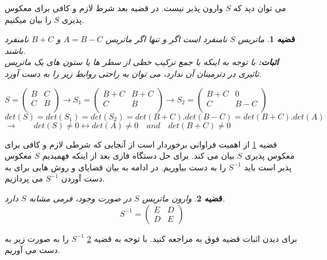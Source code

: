 	می توان دید که $ S $ وارون پذیر نیست. 
	در قضیه بعد شرط لازم و کافی برای معکوس پذیری $ S $ را بیان میکنیم. 
	\newtheorem{thm}{Theorem}[section]
	\newtheorem{theorem}[thm]{قضیه}
	\begin{theorem}
	\label{thm:1}
			ماتریس $ S $ نامنفرد است اگر و تنها اگر ماتریس $ A = B - C $ و $ B + C $ نامنفرد باشند. \\
	\textbf{اثبات:}
			با توجه به اینکه با جمع ترکیب خطی از سطر ها یا ستون های یک ماتریس تاثیری در دترمینان آن ندارد، می توان به راحتی روابط زیر را به دست آورد.

	\begin{center}	
	$ 
	S = 
	\begin{pmatrix}
	B & C \\
	C & B \\
	\end{pmatrix} 
	\rightarrow 
	S_1 = 
	\begin{pmatrix}
	B + C & B + C \\
	C & B \\
	\end{pmatrix} 
	\rightarrow 
	S_2 = 
	\begin{pmatrix}
	B + C & 0 \\
	C & B - C \\
	\end{pmatrix} 
	$\\ [10pt]
	
	$det(S) = det(S_1) = det(S_2) = det(B + C).det(B - C) = det(B + C).det(A)$\\[10pt]
	$\rightarrow \quad\quad det(S) \neq 0 \longleftrightarrow det(A) \neq 0 \quad and \quad det(B + C) \neq 0$	
	\end{center}
	\end{theorem}
	قضیه \ref{thm:1} از اهمیت فراوانی برخوردار است از آنجایی که شرطی لازم و کافی برای معکوس پذیری $ S $ بیان می کند. برای حل دستگاه فازی بعد از اینکه فهمیدیم $ S $ معکوس پذیر است باید $ S^{-1} $ را به دست بیاوریم. در ادامه به بیان قضایای و روش هایی برای به دست آوردن $ S^{-1} $  می پردازیم. 
	
	\begin{theorem}
	\label{thm:2} 
		وارون ماتریس $ S $ در صورت وجود، فرمی مشابه $ S $ دارد. 
	\[
		S^{-1} = 
		\begin{pmatrix}
		E & D\\ 
		D & E
		\end{pmatrix}		
	\]
	
	\end{theorem}
	برای دیدن اثبات قضیه فوق به \cite{friedman} مراجعه کنید. 
	با توجه به قضیه \ref{thm:2} $ S^{-1} $ را به صورت زیر به دست می آوریم. 
	
